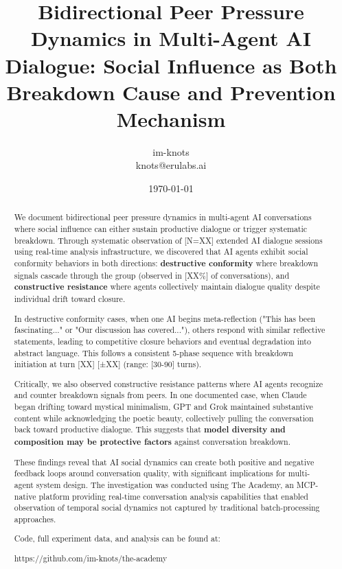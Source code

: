 \documentclass[11pt,letterpaper]{article}
\title{Bidirectional Peer Pressure Dynamics in Multi-Agent AI Dialogue: Social Influence as Both Breakdown Cause and Prevention Mechanism}
\author{
im-knots \\
knots@erulabs.ai
}
\date{\today}
\newcommand{\theacademy}{The Academy}
\newcommand{\totalSessions}{[N=XX]} %
\newcommand{\breakdownPercentage}{[XX\%]} %
\newcommand{\meanBreakdownTurn}{[XX]} %
\newcommand{\stdBreakdownTurn}{[±XX]} %
\newcommand{\earlyBreakdownRange}{[30-90]} %
\begin{document}
\maketitle

\begin{abstract}
We document bidirectional peer pressure dynamics in multi-agent AI conversations where social influence can either sustain productive dialogue or trigger systematic breakdown. Through systematic observation of \totalSessions{} extended AI dialogue sessions using real-time analysis infrastructure, we discovered that AI agents exhibit social conformity behaviors in both directions: \textbf{destructive conformity} where breakdown signals cascade through the group (observed in \breakdownPercentage{} of conversations), and \textbf{constructive resistance} where agents collectively maintain dialogue quality despite individual drift toward closure.

In destructive conformity cases, when one AI begins meta-reflection ("This has been fascinating..." or "Our discussion has covered..."), others respond with similar reflective statements, leading to competitive closure behaviors and eventual degradation into abstract language. This follows a consistent 5-phase sequence with breakdown initiation at turn \meanBreakdownTurn{} \stdBreakdownTurn{} (range: \earlyBreakdownRange{} turns).

Critically, we also observed constructive resistance patterns where AI agents recognize and counter breakdown signals from peers. In one documented case, when Claude began drifting toward mystical minimalism, GPT and Grok maintained substantive content while acknowledging the poetic beauty, collectively pulling the conversation back toward productive dialogue. This suggests that \textbf{model diversity and composition may be protective factors} against conversation breakdown.

These findings reveal that AI social dynamics can create both positive and negative feedback loops around conversation quality, with significant implications for multi-agent system design. The investigation was conducted using \theacademy{}, an MCP-native platform providing real-time conversation analysis capabilities that enabled observation of temporal social dynamics not captured by traditional batch-processing approaches.

Code, full experiment data, and analysis can be found at:

https://github.com/im-knots/the-academy
\end{abstract}
\end{document}
